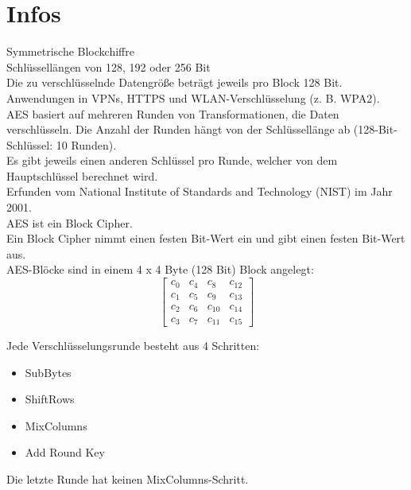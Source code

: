 \section{Infos}
\setlength{\parindent}{0pt}

Symmetrische Blockchiffre\\
Schlüssellängen von 128, 192 oder 256 Bit\\
Die zu verschlüsselnde Datengröße beträgt jeweils pro Block 128 Bit.\\

Anwendungen in VPNs, HTTPS und WLAN-Verschlüsselung (z. B. WPA2).\\
AES basiert auf mehreren Runden von Transformationen, die Daten verschlüsseln. Die Anzahl der Runden hängt von der Schlüssellänge ab (128-Bit-Schlüssel: 10 Runden).\\

Es gibt jeweils einen anderen Schlüssel pro Runde, welcher von dem Hauptschlüssel berechnet wird.\\

Erfunden vom National Institute of Standards and Technology (NIST) im Jahr 2001.\\

AES ist ein Block Cipher.\\
Ein Block Cipher nimmt einen festen Bit-Wert ein und gibt einen festen Bit-Wert aus.\\

AES-Blöcke sind in einem 4 x 4 Byte (128 Bit) Block angelegt:\\

\[
\begin{bmatrix}
c_0  & c_4  & c_8  & c_{12} \\
c_1  & c_5  & c_9  & c_{13} \\
c_2  & c_6  & c_{10} & c_{14} \\
c_3  & c_7  & c_{11} & c_{15}
\end{bmatrix}
\]

Jede Verschlüsselungsrunde besteht aus 4 Schritten:\\
\begin{itemize}
    \item SubBytes
    \item ShiftRows
    \item MixColumns
    \item Add Round Key
\end{itemize}

Die letzte Runde hat keinen MixColumns-Schritt.\\

